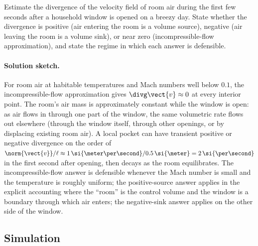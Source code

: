 \begin{exercise}
Estimate the divergence of the velocity field of room air during
the first few seconds after a household window is opened on a
breezy day. State whether the divergence is positive (air entering
the room is a volume source), negative (air leaving the room is a
volume sink), or near zero (incompressible-flow approximation), and
state the regime in which each answer is defensible.

\paragraph{Solution sketch.} For room air at habitable temperatures
and Mach numbers well below $0.1$, the incompressible-flow
approximation gives $\divg\vect{v} \approx 0$ at every interior
point. The room's air mass is approximately constant while the
window is open: as air flows in through one part of the window, the
same volumetric rate flows out elsewhere (through the window itself,
through other openings, or by displacing existing room air). A
local pocket can have transient positive or negative divergence on
the order of $\norm{\vect{v}}/\ell \approx 1\,\si{\meter\per\second}
/0.5\,\si{\meter} = 2\,\si{\per\second}$ in the first second after
opening, then decays as the room equilibrates. The
incompressible-flow answer is defensible whenever the Mach number
is small and the temperature is roughly uniform; the
positive-source answer applies in the explicit accounting where the
``room'' is the control volume and the window is a boundary
through which air enters; the negative-sink answer applies on the
other side of the window.
\end{exercise}

\subsection*{Simulation}

